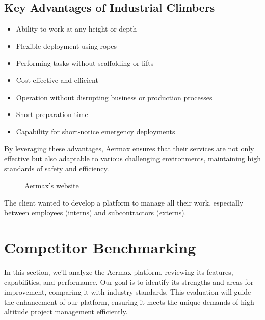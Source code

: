 \subsection*{Key Advantages of Industrial Climbers}
\begin{itemize}
  \item Ability to work at any height or depth
  \item Flexible deployment using ropes
  \item Performing tasks without scaffolding or lifts
  \item Cost-effective and efficient
  \item Operation without disrupting business or production processes
  \item Short preparation time
  \item Capability for short-notice emergency deployments
\end{itemize}

By leveraging these advantages, Aermax ensures that their services are not only effective but also adaptable to various challenging environments, maintaining high standards of safety and efficiency.

\begin{figure}[H]
    \centering
    \caption{Aermax’s website}
    \label{fig:aermax-website}
\end{figure}

The client wanted to develop a platform to manage all their work, especially between employees (interns) and subcontractors (externs).

\section{Competitor Benchmarking}
In this section, we’ll analyze the Aermax platform, reviewing its features, capabilities, and performance. Our goal is to identify its strengths and areas for improvement, comparing it with industry standards. This evaluation will guide the enhancement of our platform, ensuring it meets the unique demands of high-altitude project management efficiently.

